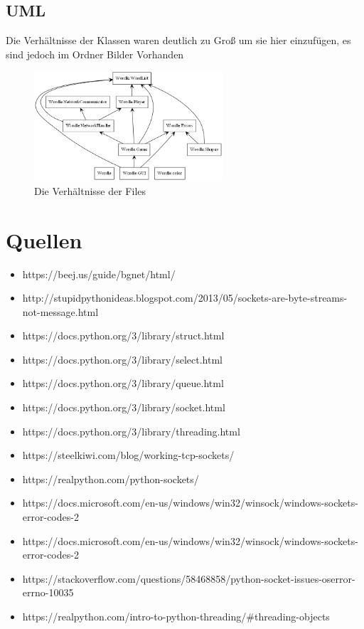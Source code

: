 \documentclass[a4paper]{article}
\begin{document}
        \subsection{UML}
            Die Verhältnisse der Klassen waren deutlich zu Groß um sie hier einzufügen, es sind jedoch im Ordner Bilder Vorhanden
            \begin{figure}[h]
                \includegraphics[width=7cm]{images/Files.png}
                \centering
                \caption{Die Verhältnisse der Files}
            \end{figure}
        
    \pagebreak
    
    \section{Quellen}
        \begin{itemize}
            \item https://beej.us/guide/bgnet/html/
            \item http://stupidpythonideas.blogspot.com/2013/05/sockets-are-byte-streams-not-message.html
            \item https://docs.python.org/3/library/struct.html
            \item https://docs.python.org/3/library/select.html
            \item https://docs.python.org/3/library/queue.html
            \item https://docs.python.org/3/library/socket.html
            \item https://docs.python.org/3/library/threading.html
            \item https://steelkiwi.com/blog/working-tcp-sockets/
            \item https://realpython.com/python-sockets/
            \item https://docs.microsoft.com/en-us/windows/win32/winsock/windows-sockets-error-codes-2
            \item https://docs.microsoft.com/en-us/windows/win32/winsock/windows-sockets-error-codes-2
            \item https://stackoverflow.com/questions/58468858/python-socket-issues-oserror-errno-10035
            \item https://realpython.com/intro-to-python-threading/#threading-objects
        \end{itemize}
    
    
\end{document}
